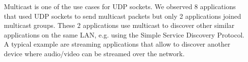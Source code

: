 Multicast is one of the use cases for UDP sockets. We observed 8
applications that used UDP sockets to send multicast packets but
only 2 applications joined multicast groups. These 2 applications use
multicast to discover other similar applications on the same LAN, e.g.
using the Simple Service Discovery Protocol. A typical example are
streaming applications that allow to discover another device where
audio/video can be streamed over the network.
